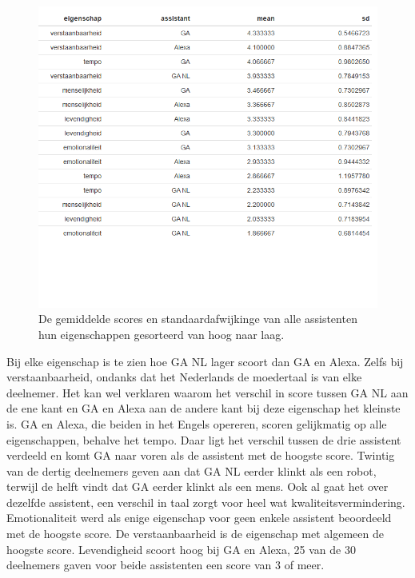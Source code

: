 \begin{figure}[H]
    \centering
    \includegraphics[width=0.9\linewidth]{../onderzoek/onderzoeksresultaten/vergelijking_assistenten_per_eigenschap/table_mean_sd_scores}
    \caption{De gemiddelde scores en standaardafwijkinge van alle assistenten hun eigenschappen gesorteerd van hoog naar laag.}
    \label{fig:table-mean-sd-scores}
\end{figure}

Bij elke eigenschap is te zien hoe \gls{GA NL} lager scoort dan \gls{GA} en Alexa. Zelfs bij verstaanbaarheid, ondanks dat het Nederlands de moedertaal is van elke deelnemer. Het kan wel verklaren waarom het verschil in score tussen \gls{GA NL} aan de ene kant en \gls{GA} en Alexa aan de andere kant bij deze eigenschap het kleinste is. \gls{GA} en Alexa, die beiden in het Engels opereren, scoren gelijkmatig op alle eigenschappen, behalve het tempo. Daar ligt het verschil tussen de drie assistent verdeeld en komt \gls{GA} naar voren als de assistent met de hoogste score.
Twintig van de dertig deelnemers geven aan dat \gls{GA NL} eerder klinkt als een robot, terwijl de helft vindt dat \gls{GA} eerder klinkt als een mens. Ook al gaat het over dezelfde assistent, een verschil in taal zorgt voor heel wat kwaliteitsvermindering.
Emotionaliteit werd als enige eigenschap voor geen enkele assistent beoordeeld met de hoogste score. De verstaanbaarheid is de eigenschap met algemeen de hoogste score.
Levendigheid scoort hoog bij \gls{GA} en Alexa, 25 van de 30 deelnemers gaven voor beide assistenten een score van 3 of meer.

